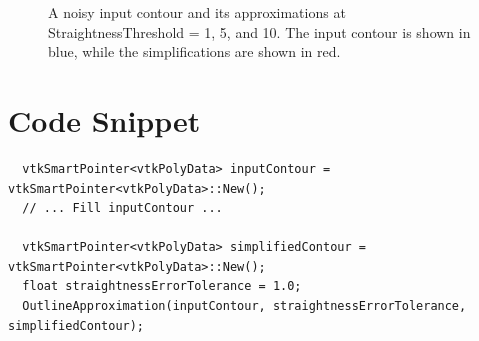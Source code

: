 \documentclass{InsightArticle}
\begin{document}
\begin{enumerate}
\begin{figure}[H]
\centering
{}
\caption{A noisy input contour and its approximations at StraightnessThreshold = 1, 5, and 10. The input contour is shown in blue, while the simplifications are shown in red.}
\label{fig:NoisyDemo}
\end{figure}


\section{Code Snippet}

\begin{verbatim}
  vtkSmartPointer<vtkPolyData> inputContour = vtkSmartPointer<vtkPolyData>::New();
  // ... Fill inputContour ...

  vtkSmartPointer<vtkPolyData> simplifiedContour = vtkSmartPointer<vtkPolyData>::New();
  float straightnessErrorTolerance = 1.0;
  OutlineApproximation(inputContour, straightnessErrorTolerance, simplifiedContour);
 

\end{verbatim}
\end{enumerate}
\end{document}
